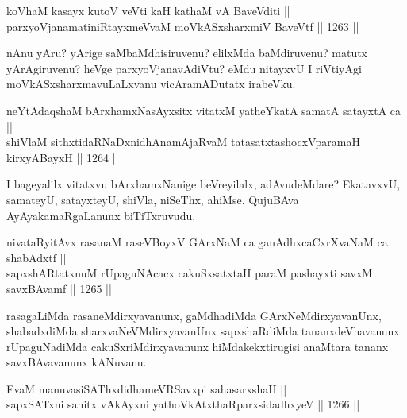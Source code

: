\begin{shl}
koV\s haM kasayx kutoV veVti kaH kathaM vA BaveVditi ||  \\
parxyoVjanamatiniRtayxmeVvaM moVkASxsharxmiV BaveVtf \hfill || 1263 ||  
\end{shl}

\begin{artha}
nAnu yAru? yArige saMbaMdhisiruvenu? elilxMda baMdiruvenu? matutx yArAgiruvenu? heVge parxyoVjanavAdiVtu? eMdu nitayxvU I riVtiyAgi moVkASxsharxmavuLaLxvanu vicAramADutatx irabeVku.
\end{artha}


\begin{shl}
neYtAdaqshaM bArxhamxNasAyxsitx vitatxM yatheYkatA samatA satayxtA ca || \\
shiVlaM sithxtidaRNaDxnidhAnamAjaRvaM tatasatxtashocxVparamaH kirxyABayxH \hfill || 1264 ||  
\end{shl}

\begin{artha}
I bageyalilx vitatxvu bArxhamxNanige beVreyilalx, adAvudeMdare? EkatavxvU, samateyU, satayxteyU, shiVla, niSeThx, ahiMse. QujuBAva AyAyakamaRgaLanunx biTiTxruvudu.
\end{artha}

\begin{shl}
nivataRyitAvx rasanaM raseVBoyxV GArxNaM ca ganAdhxcaCxrXvaNaM ca shabAdxtf || \\
sapxshARtatxnuM rUpaguNAcacx cakuSxsatxtaH paraM pashayxti savxM savxBAvamf \hfill || 1265 ||  
\end{shl}

\begin{artha}
rasagaLiMda rasaneMdirxyavanunx, gaMdhadiMda GArxNeMdirxyavanUnx, shabadxdiMda sharxvaNeVMdirxyavanUnx sapxshaRdiMda tananxdeVhavanunx rUpaguNadiMda cakuSxriMdirxyavanunx hiMdakekxtirugisi anaMtara tananx savxBAvavanunx kANuvanu.
\end{artha}

\begin{shl}
EvaM manuvasiSAThxdidhameVRSavxpi sahasarxshaH || \\
sapxSATxni sanitx vAkAyxni yathoVkAtxthaRparxsidadhxyeV \hfill || 1266 || 
\end{shl}

